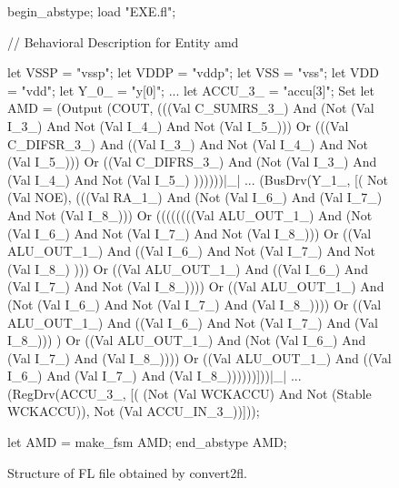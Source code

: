 \begin{figure}[hbtp]
\begin{hol}
begin\_abstype;
load "EXE.fl";


// Behavioral Description for Entity amd


let VSSP = "vssp";
let VDDP = "vddp";
let VSS = "vss";
let VDD = "vdd";
let Y\_0\_ = "y[0]";
...
let ACCU\_3\_ = "accu[3]";
{Set} let AMD =
        (Output (COUT,
        (((Val C\_SUMRS\_3\_) And (Not (Val I\_3\_) And Not (Val I\_4\_)
         And Not (Val I\_5\_))) Or (((Val C\_DIFSR\_3\_) And ((Val I\_3\_)
         And Not (Val I\_4\_) And Not (Val I\_5\_))) Or ((Val C\_DIFRS\_3\_)
         And (Not (Val I\_3\_) And (Val I\_4\_) And Not (Val I\_5\_)
        ))))))|\_|
...
        (BusDrv(Y\_1\_, [(
        Not (Val NOE),
        (((Val RA\_1\_) And (Not (Val I\_6\_) And (Val I\_7\_) And
        Not (Val I\_8\_))) Or ((((((((Val ALU\_OUT\_1\_) And (Not (Val I\_6\_)
         And Not (Val I\_7\_) And Not (Val I\_8\_))) Or ((Val ALU\_OUT\_1\_)
         And ((Val I\_6\_) And Not (Val I\_7\_) And Not (Val I\_8\_)
        ))) Or ((Val ALU\_OUT\_1\_) And ((Val I\_6\_) And (Val I\_7\_)
         And Not (Val I\_8\_)))) Or ((Val ALU\_OUT\_1\_) And (Not (Val I\_6\_)
         And Not (Val I\_7\_) And (Val I\_8\_)))) Or ((Val ALU\_OUT\_1\_)
         And ((Val I\_6\_) And Not (Val I\_7\_) And (Val I\_8\_)))
        ) Or ((Val ALU\_OUT\_1\_) And (Not (Val I\_6\_) And (Val I\_7\_)
         And (Val I\_8\_)))) Or ((Val ALU\_OUT\_1\_) And ((Val I\_6\_)
         And (Val I\_7\_) And (Val I\_8\_))))))]))|\_|
...
        (RegDrv(ACCU\_3\_, [(
        (Not (Val WCKACCU) And Not (Stable WCKACCU)),
        Not (Val ACCU\_IN\_3\_))]));

let AMD = make\_fsm AMD;
end\_abstype AMD;
\end{hol}
\caption{Structure of FL file obtained by convert2fl.}
\label{amd2901.beh.fl}
\end{figure}

